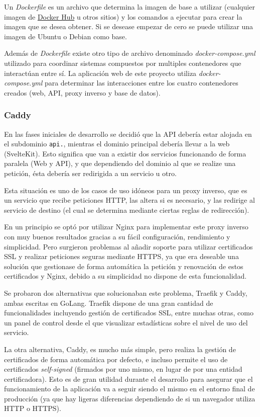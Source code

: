 Un \textit{Dockerfile} es un archivo que determina la imagen de base a utilizar
(cualquier imagen de \href{https://hub.docker.com/}{Docker Hub} u otros sitios)
y los comandos a ejecutar para crear la imagen que se desea obtener. Si se
desease empezar de cero se puede utilizar una imagen de Ubuntu o Debian como
base.

Además de \textit{Dockerfile} existe otro tipo de archivo denominado
\textit{docker-compose.yml} utilizado para coordinar sistemas compuestos por
multiples contenedores que interactúan entre sí. La aplicación web de este
proyecto utiliza \textit{docker-compose.yml} para determinar las interacciones
entre los cuatro contenedores creados (web, API, proxy inverso y base de
datos).

\subsubsection{Caddy}

En las fases iniciales de desarrollo se decidió que la API debería estar alojada
en el subdominio \texttt{api.}, mientras el dominio principal debería llevar a
la web (SvelteKit). Esto significa que van a existir dos servicios funcionando
de forma paralela (Web y API), y que dependiendo del dominio al que se realize
una petición, ésta debería ser redirigida a un servicio u otro.

Esta situación es uno de los casos de uso idóneos para un proxy inverso, que es
un servicio que recibe peticiones HTTP, las altera si es necesario, y las
redirige al servicio de destino (el cual se determina mediante ciertas reglas de
redirección).

En un principio se optó por utilizar Nginx para implementar este proxy inverso
con muy buenos resultados gracias a su fácil configuración, rendimiento y
simplicidad. Pero surgieron problemas al añadir soporte para utilizar
certificados SSL y realizar peticiones seguras mediante HTTPS, ya que era
deseable una solución que gestionase de forma automática la petición y
renovación de estos certificados y Nginx, debido a su simplicidad no dispone de
esta funcionalidad.

Se probaron dos alternativas que solucionaban este problema, Traefik y Caddy,
ambas escritas en GoLang. Traefik dispone de una gran cantidad de
funcionalidades incluyendo gestión de certificados SSL, entre muchas otras, como
un panel de control desde el que visualizar estadísticas sobre el nivel de uso
del servicio.

La otra alternativa, Caddy, es mucho más simple, pero realiza la gestión de
certificados de forma automática por defecto, e incluso permite el uso de
certificados \textit{self-signed} (firmados por uno mismo, en lugar de por una
entidad certificadora). Esto es de gran utilidad durante el desarrollo para
asegurar que el funcionamiento de la aplicación va a seguir siendo el mismo en
el entorno final de producción (ya que hay ligeras diferencias dependiendo de si
un navegador utiliza HTTP o HTTPS).

